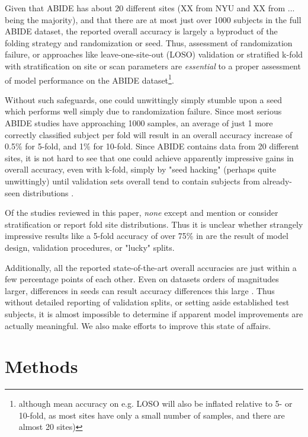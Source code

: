 \documentclass[10pt]{article}
\begin{document}
Given that ABIDE has about 20 different sites (XX from NYU and XX from ... being the majority), and
that there are at most just over 1000 subjects in the full ABIDE dataset, the reported overall
accuracy is largely a byproduct of the folding strategy and randomization or seed. Thus, assessment
of randomization failure, or approaches like leave-one-site-out (LOSO) validation or stratified
k-fold with stratification on site or scan parameters are \emph{essential} to a proper assessment of
model performance on the ABIDE dataset\footnote{although mean accuracy on e.g. LOSO will also be
inflated relative to 5- or 10-fold, as most sites have only a small number of samples, and there are
almost 20 sites)}.

Without such safeguards, one could unwittingly simply stumble upon a seed which performs well simply
due to randomization failure. Since most serious ABIDE studies have approaching 1000 samples, an
average of just 1 more correctly classified subject per fold will result in an overall accuracy
increase of 0.5\% for 5-fold, and 1\% for 10-fold. Since ABIDE contains data from 20 different
sites, it is not hard to see that one could achieve apparently impressive gains in overall accuracy,
even with k-fold, simply by "seed hacking" (perhaps quite unwittingly) until validation sets overall
tend to contain subjects from already-seen distributions \citep{picardTorchManualSeed2021}.

Of the studies reviewed in this paper, \emph{none} except
\citet{ingalhalikarFunctionalConnectivitybasedPrediction2021} and
\citet{byeonArtificialNeuralNetwork2020} mention or consider stratification or report fold site
distributions. Thus it is unclear whether strangely impressive results like a 5-fold accuracy of
over 75\% in \citet{yangDeepNeuralNetwork2020} are the result of model design, validation
procedures, or "lucky" splits.

Additionally, all the reported state-of-the-art overall accuracies are just within a few percentage
points of each other. Even on datasets orders of magnitudes larger, differences in seeds can result
accuracy differences this large \citep{picardTorchManualSeed2021}. Thus without detailed reporting
of validation splits, or setting aside established test subjects, it is almost impossible to
determine if apparent model improvements are actually meaningful. We also make efforts to improve
this state of affairs.

\section{Methods} \label{sec:methods}
\end{document}
